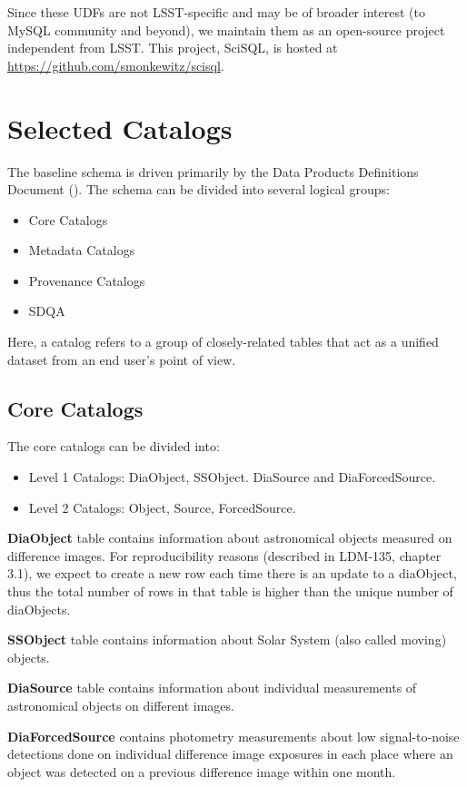 \documentclass[DM,lsstdraft,toc]{lsstdoc}
\begin{document}
Since these UDFs are not LSST-specific and may be of broader interest (to MySQL community and beyond), we maintain them as an open-source project independent from LSST. This project, SciSQL, is hosted at \url{https://github.com/smonkewitz/scisql}.

\section{Selected Catalogs}

The baseline schema is driven primarily by the Data Products Definitions Document (\DPDD). The schema can be divided into several logical groups:

\begin{itemize}
  \item Core Catalogs
  \item Metadata Catalogs
  \item Provenance Catalogs
  \item SDQA
\end{itemize}

Here, a catalog refers to a group of closely-related tables that act as a unified dataset from an end user's point of view.

\subsection{Core Catalogs}

The core catalogs can be divided into:
\begin{itemize}
  \item Level 1 Catalogs: DiaObject, SSObject. DiaSource and DiaForcedSource.
  \item Level 2 Catalogs: Object, Source, ForcedSource.
\end{itemize}

\textbf{DiaObject} table contains information about astronomical objects measured on difference images. For reproducibility reasons (described in LDM-135, chapter 3.1), we expect to create a new row each time there is an update to a diaObject, thus the total number of rows in that table is higher than the unique number of diaObjects. 

\textbf{SSObject} table contains information about Solar System (also called moving) objects.

\textbf{DiaSource} table contains information about individual measurements of astronomical objects on different images.

\textbf{DiaForcedSource} contains photometry measurements about low signal-to-noise detections done on individual difference image exposures in each place where an object was detected on a previous difference image within one month.
\end{document}
